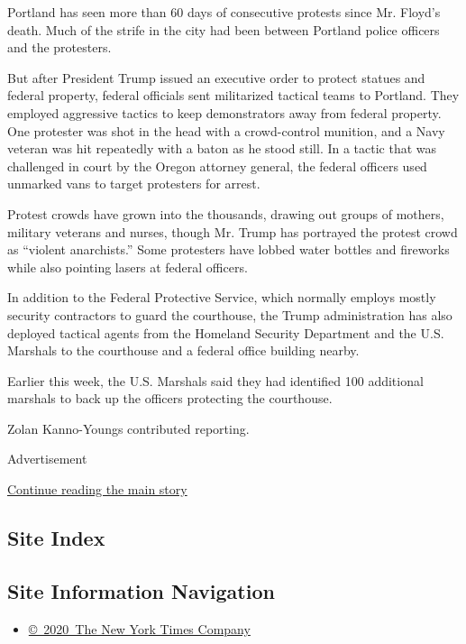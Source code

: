 Portland has seen more than 60 days of consecutive protests since Mr.
Floyd's death. Much of the strife in the city had been between Portland
police officers and the protesters.

But after President Trump issued an executive order to protect statues
and federal property, federal officials sent militarized tactical teams
to Portland. They employed aggressive tactics to keep demonstrators away
from federal property. One protester was shot in the head with a
crowd-control munition, and a Navy veteran was hit repeatedly with a
baton as he stood still. In a tactic that was challenged in court by the
Oregon attorney general, the federal officers used unmarked vans to
target protesters for arrest.

Protest crowds have grown into the thousands, drawing out groups of
mothers, military veterans and nurses, though Mr. Trump has portrayed
the protest crowd as ``violent anarchists.'' Some protesters have lobbed
water bottles and fireworks while also pointing lasers at federal
officers.

In addition to the Federal Protective Service, which normally employs
mostly security contractors to guard the courthouse, the Trump
administration has also deployed tactical agents from the Homeland
Security Department and the U.S. Marshals to the courthouse and a
federal office building nearby.

Earlier this week, the U.S. Marshals said they had identified 100
additional marshals to back up the officers protecting the courthouse.

Zolan Kanno-Youngs contributed reporting.

Advertisement

\protect\hyperlink{after-bottom}{Continue reading the main story}

\hypertarget{site-index}{%
\subsection{Site Index}\label{site-index}}

\hypertarget{site-information-navigation}{%
\subsection{Site Information
Navigation}\label{site-information-navigation}}

\begin{itemize}
\tightlist
\item
  \href{https://help.nytimes.com/hc/en-us/articles/115014792127-Copyright-notice}{©~2020~The
  New York Times Company}
\end{itemize}

